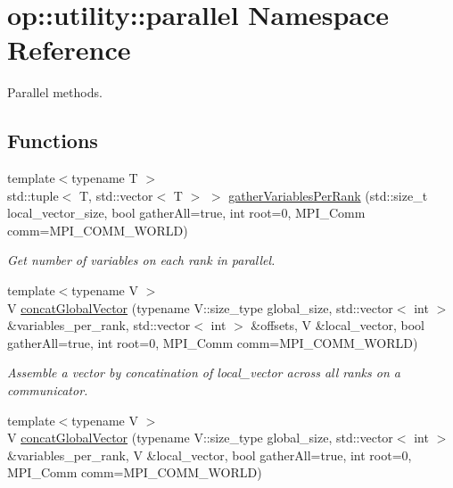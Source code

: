 \hypertarget{namespaceop_1_1utility_1_1parallel}{\section{op\-:\-:utility\-:\-:parallel Namespace Reference}
\label{namespaceop_1_1utility_1_1parallel}
}


Parallel methods.  


\subsection*{Functions}
\begin{DoxyCompactItemize}
\item 
{\footnotesize template$<$typename T $>$ }\\std\-::tuple$<$ T, std\-::vector$<$ T $>$ $>$ \hyperlink{namespaceop_1_1utility_1_1parallel_a0ab8cfdc3bdf75222f6644936564ca6b}{gather\-Variables\-Per\-Rank} (std\-::size\-\_\-t local\-\_\-vector\-\_\-size, bool gather\-All=true, int root=0, M\-P\-I\-\_\-\-Comm comm=M\-P\-I\-\_\-\-C\-O\-M\-M\-\_\-\-W\-O\-R\-L\-D)
\begin{DoxyCompactList}\small\item\em Get number of variables on each rank in parallel. \end{DoxyCompactList}\item 
{\footnotesize template$<$typename V $>$ }\\V \hyperlink{namespaceop_1_1utility_1_1parallel_aa00121afb5555dc0d9704a15b7ac4f39}{concat\-Global\-Vector} (typename V\-::size\-\_\-type global\-\_\-size, std\-::vector$<$ int $>$ \&variables\-\_\-per\-\_\-rank, std\-::vector$<$ int $>$ \&offsets, V \&local\-\_\-vector, bool gather\-All=true, int root=0, M\-P\-I\-\_\-\-Comm comm=M\-P\-I\-\_\-\-C\-O\-M\-M\-\_\-\-W\-O\-R\-L\-D)
\begin{DoxyCompactList}\small\item\em Assemble a vector by concatination of local\-\_\-vector across all ranks on a communicator. \end{DoxyCompactList}\item 
{\footnotesize template$<$typename V $>$ }\\V \hyperlink{namespaceop_1_1utility_1_1parallel_a052b5b9607f05e3628c59e706c84783b}{concat\-Global\-Vector} (typename V\-::size\-\_\-type global\-\_\-size, std\-::vector$<$ int $>$ \&variables\-\_\-per\-\_\-rank, V \&local\-\_\-vector, bool gather\-All=true, int root=0, M\-P\-I\-\_\-\-Comm comm=M\-P\-I\-\_\-\-C\-O\-M\-M\-\_\-\-W\-O\-R\-L\-D)

\end{DoxyCompactItemize}
